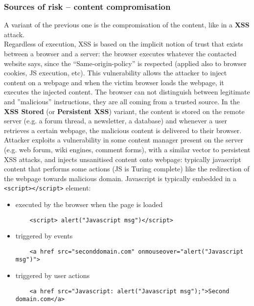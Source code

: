 \documentclass[a4paper, 10pt, titlepage]{article}
\begin{document}
\subsubsection*{Sources of risk – content compromisation}
A variant of the previous one is the compromisation of the content, like in a \textbf{XSS} attack. \medskip\\
Regardless of execution, XSS is based on the implicit notion of trust that exists between a browser and a server: the browser executes whatever the contacted website says, since the “Same-origin-policy” is respected (applied also to browser cookies, JS execution, etc). This vulnerability allows the attacker to inject content on a webpage and when the victim browser loads the webpage, it executes the injected content. The browser can not distinguish between legitimate and ”malicious” instructions, they are all coming from a trusted source.
In the \textbf{XSS Stored} (or \textbf{Persistent XSS}) variant, the content is stored on the remote server (e.g. a forum thread, a newsletter, a database) and whenever a user retrieves a certain webpage, the malicious content is delivered to their browser. \medskip\\
Attacker exploits a vulnerability in some content manager present on the server (e.g. web forum, wiki engines, comment forms), with a similar vector to persistent XSS attacks, and injects unsanitised content onto webpage: typically javascript content that performs some actions (JS is Turing complete) like the redirection of the webpage towards malicious domain. Javascript is typically embedded in a \lstinline|<script></script>| element:
\begin{itemize}
	\item executed by the browser when the page is loaded
	\begin{footnotesize}
	\begin{lstlisting}
	<script> alert("Javascript msg")</script>
	\end{lstlisting}
	\end{footnotesize}
	\item triggered by events
	\begin{footnotesize}
	\begin{lstlisting}
	<a href src="seconddomain.com" onmouseover="alert("Javascript msg")">
	\end{lstlisting}
	\end{footnotesize}
	\item triggered by user actions
	\begin{footnotesize}
	\begin{lstlisting}
	<a href src="Javascript: alert("Javascript msg");">Second domain.com</a>
	\end{lstlisting}
	\end{footnotesize}
\end{itemize}
\end{document}
